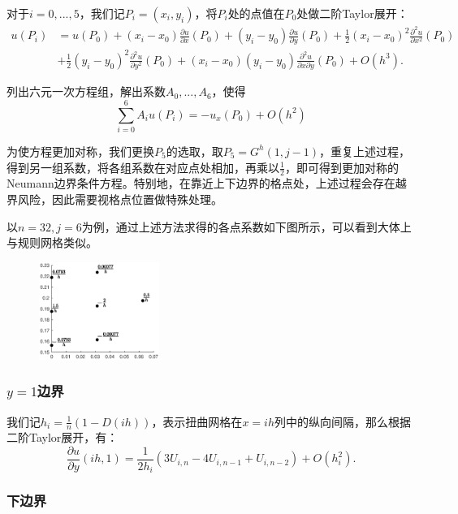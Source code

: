 \documentclass[lang=cn,10pt]{elegantbook}
\begin{document}
对于$i=0,...,5$，我们记$P_i=(x_i,y_i)$，将$P_i$处的点值在$P_0$处做二阶Taylor展开：
\begin{align*}
  u(P_i)&=u(P_0)+(x_i-x_0)\frac{\partial u}{\partial x}(P_0)+(y_i-y_0)\frac{\partial u}{\partial y}(P_0)
  +\frac{1}{2}(x_i-x_0)^2\frac{\partial^2 u}{\partial x^2}(P_0) \\
  & +\frac{1}{2}(y_i-y_0)^2\frac{\partial^2 u}{\partial y^2}(P_0)
  +(x_i-x_0)(y_i-y_0)\frac{\partial^2 u}{\partial x \partial y}(P_0)+O(h^3).
\end{align*}

列出六元一次方程组，解出系数$A_0,...,A_6$，使得
\begin{equation*}
  \sum_{i=0}^6 A_iu(P_i)=-u_x(P_0)+O(h^2)
\end{equation*}

为使方程更加对称，我们更换$P_5$的选取，取$P_5=G^h(1,j-1)$，重复上述过程，得到另一组系数，将各组系数在对应点处相加，再乘以$\frac{1}{2}$，即可得到更加对称的Neumann边界条件方程。特别地，在靠近上下边界的格点处，上述过程会存在越界风险，因此需要视格点位置做特殊处理。

以$n=32,j=6$为例，通过上述方法求得的各点系数如下图所示，可以看到大体上与规则网格类似。

\begin{figure}[H]
  \centering
  \includegraphics[width=0.35\textwidth]{figure/3-3.eps}
\end{figure}

\subsubsection{$y=1$边界}

我们记$h_i=\frac{1}{n}(1-D(ih))$，表示扭曲网格在$x=ih$列中的纵向间隔，那么根据二阶Taylor展开，有：
\begin{equation*}
  \frac{\partial u}{\partial y}(ih,1) = \frac{1}{2h_i}(3U_{i,n}-4U_{i,n-1}+U_{i,n-2})+O(h_i^2).
\end{equation*}

\subsubsection{下边界}
\end{document}

